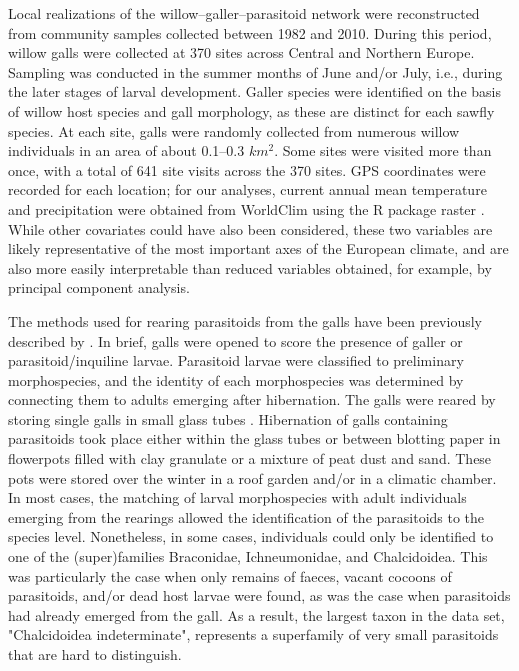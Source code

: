 \documentclass[12pt]{article}
\begin{document}
Local realizations of the willow–galler–parasitoid network were reconstructed
from community samples collected between 1982 and 2010. During this period,
willow galls were collected at 370 sites across Central and Northern Europe.
Sampling was conducted in the summer months of June and/or July, i.e., during
the later stages of larval development. Galler species were identified on the
basis of willow host species and gall morphology, as these are distinct for
each sawfly species. At each site, galls were randomly collected from numerous
willow individuals in an area of about 0.1–0.3 $km^2$. Some sites were visited
more than once, with a total of 641 site visits across the 370 sites. GPS
coordinates were recorded for each location; for our analyses, current
annual mean temperature and precipitation were obtained from WorldClim using
the R package raster \citep{Hijmans2015}. While other covariates could have
also been considered, these two variables are likely representative of the most
important axes of the European climate, and are also more easily interpretable than
reduced variables obtained, for example, by principal component analysis.

The methods used for rearing parasitoids from the galls have been
previously described by \citealt{Kopelke2003}. In brief, galls were
opened to score the presence of galler or parasitoid/inquiline larvae. Parasitoid
larvae were classified to preliminary morphospecies, and the identity of each
morphospecies was determined by connecting them to adults emerging after
hibernation. The galls were reared by storing single galls in small glass
tubes \citep{Kopelke1985a}. Hibernation of galls containing parasitoids took place
either within the glass tubes or between blotting paper in flowerpots filled
with clay granulate or a mixture of peat dust and sand. These pots were stored
over the winter in a roof garden and/or in a climatic chamber. In most cases,
the matching of larval morphospecies with adult individuals emerging from the
rearings allowed the identification of the parasitoids to the species
level. Nonetheless, in some cases, individuals could only be identified to one
of the (super)families Braconidae, Ichneumonidae, and Chalcidoidea. This was
particularly the case when only remains of faeces, vacant cocoons of
parasitoids, and/or dead host larvae were found, as was the case when
parasitoids had already emerged from the gall. As a result, the largest taxon
in the data set, "Chalcidoidea indeterminate", represents a superfamily of
very small parasitoids that are hard to distinguish.
\end{document}
